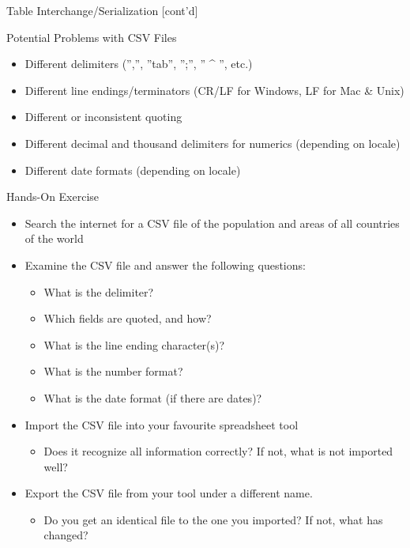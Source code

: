 \documentclass[ignorenonframetext,xcolor=x11names]{beamer}
\begin{document}
\begin{frame}{Table Interchange/Serialization \small [cont'd]}
\begin{block}{Potential Problems with CSV Files}
\begin{itemize}
	\item Different delimiters ('','', ''tab'', '';'', ''{ }\^{} '', etc.)
	\item Different line endings/terminators (CR/LF for Windows, LF for Mac \& Unix)
	\item Different or inconsistent quoting
	\item Different decimal and thousand delimiters for numerics (depending on locale)
	\item Different date formats (depending on locale)
\end{itemize}
\end{block}
\end{frame}

\begin{frame}{Hands-On Exercise}
\begin{itemize}
	\item Search the internet for a CSV file of the population and areas of all countries of the world
	\item Examine the CSV file and answer the following questions:
	\begin{itemize}
		\item What is the delimiter?
		\item Which fields are quoted, and how?
		\item What is the line ending character(s)?
		\item What is the number format?
		\item What is the date format (if there are dates)?
	\end{itemize}
	\item Import the CSV file into your favourite spreadsheet tool
	\begin{itemize}
		\item Does it recognize all information correctly? If not, what is not imported well?
	\end{itemize}
	\item Export the CSV file from your tool under a different name.
	\begin{itemize}
		\item Do you get an identical file to the one you imported? If not, what has changed?
	\end{itemize}
\end{itemize}
\end{frame}
\end{document}
